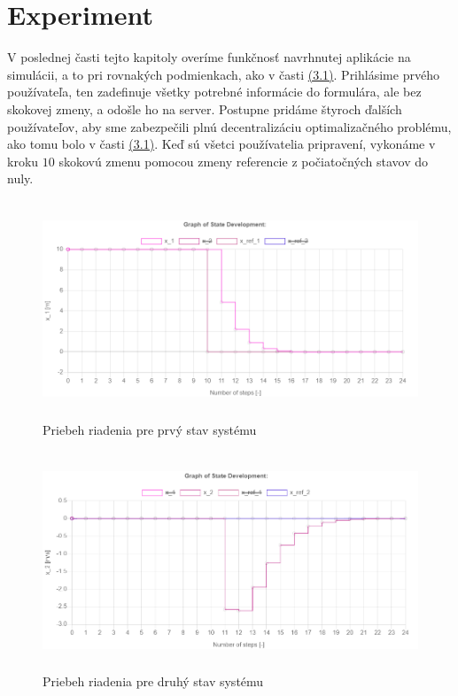 \section{Experiment}
V poslednej časti tejto kapitoly overíme funkčnosť navrhnutej aplikácie na simulácii, a to pri rovnakých podmienkach, ako v časti \hyperref[sec:HB]{(3.1)}. Prihlásime prvého používateľa, ten zadefinuje všetky potrebné informácie do formulára, ale bez skokovej zmeny, a odošle ho na server. Postupne pridáme štyroch ďalších používateľov, aby sme zabezpečili plnú decentralizáciu optimalizačného problému, ako tomu bolo v časti \hyperref[sec:HB]{(3.1)}. Keď sú všetci používatelia pripravení, vykonáme v kroku $10$ skokovú zmenu pomocou zmeny referencie z počiatočných stavov do nuly.
\begin{center}
	\begin{figure}[H]
		\centering
		\includegraphics[width=13cm,height=6.5cm]{images/Hmotny_bod_apk/x0}
		\caption{Priebeh riadenia pre prvý stav systému}
	\end{figure}
\end{center}
\begin{figure}[H]
	\centering
	\includegraphics[width=13cm,height=6.5cm]{images/Hmotny_bod_apk/x1}
	\caption{Priebeh riadenia pre druhý stav systému}
\end{figure}

